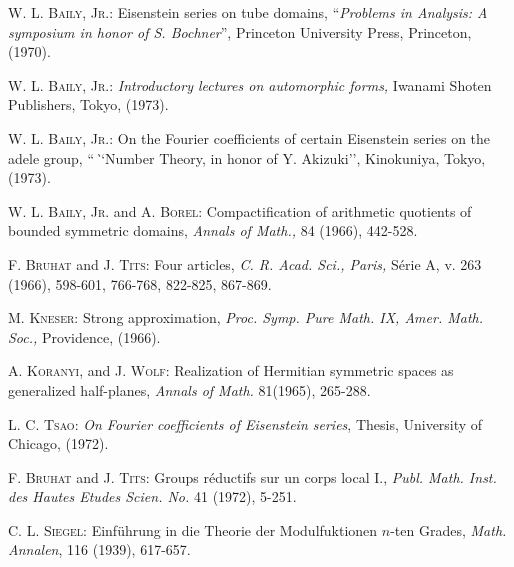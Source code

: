 \begin{thebibliography}{99}
 \textsc{W. L. Baily, Jr.}: Eisenstein series on tube domains, ``\textit{Problems in Analysis: A symposium in honor of S. Bochner}'', Princeton University Press, Princeton, (1970).

 \textsc{W. L. Baily, Jr.}: \textit{Introductory lectures on automorphic forms,} Iwanami Shoten Publishers, Tokyo, (1973).

 \textsc{W. L. Baily, Jr.}: On the Fourier coefficients of certain Eisenstein series on the adele group, ``\textit``{Number Theory, in honor of Y. Akizuki}'', Kinokuniya, Tokyo, (1973).

 \textsc{W. L. Baily, Jr.} and \textsc{A. Borel}: Compactification of arithmetic quotients of bounded symmetric domains, \textit{Annals of Math.,} 84 (1966), 442-528.

 \textsc{F. Bruhat} and \textsc{J. Tits:} Four articles, \textit{C. R. Acad. Sci., Paris,} S\'erie A, v. 263 (1966), 598-601, 766-768, 822-825, 867-869. 

 \textsc{M. Kneser}: Strong approximation, \textit{Proc. Symp. Pure Math. IX, Amer. Math. Soc.,} Providence, (1966).

 \textsc{A. Koranyi}, and \textsc{J. Wolf}: Realization of Hermitian symmetric spaces as generalized half-planes, \textit{Annals of Math.} 81(1965), 265-288.

 \textsc{L. C. Tsao}: \textit{On Fourier coefficients of Eisenstein series}, Thesis, University of Chicago, (1972).

 \textsc{F. Bruhat} and \textsc{J. Tits}: Groups r\'eductifs sur un corps local I., \textit{Publ. Math. Inst. des Hautes Etudes Scien. No.} 41 (1972), 5-251.

  \textsc{C. L. Siegel}: Einf\"uhrung in die Theorie der Modulfuktionen $n$-ten Grades, \textit{Math. Annalen}, 116 (1939), 617-657.
\end{thebibliography}






